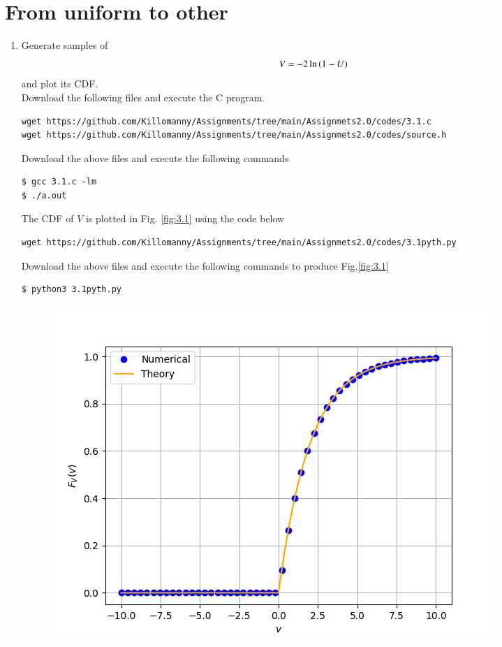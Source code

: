 \documentclass[journal,12pt,twocolumn]{IEEEtran}
\renewcommand\thesection{\arabic{section}}
\begin{document}
\section{From uniform to other}
\begin{enumerate}[label=\thesection.\arabic*
,ref=\thesection.\theenumi]
\item
Generate samples of 
%
\begin{equation}
V = -2\ln\left(1-U\right)
\end{equation}
%
and plot its CDF.  \\
\solution Download the following files and execute the  C program.
\begin{lstlisting}
wget https://github.com/Killomanny/Assignments/tree/main/Assignmets2.0/codes/3.1.c
wget https://github.com/Killomanny/Assignments/tree/main/Assignmets2.0/codes/source.h
\end{lstlisting}
Download the above files and execute the following commands
\begin{lstlisting}
$ gcc 3.1.c -lm
$ ./a.out
\end{lstlisting}
The CDF of $V$ is plotted in Fig. \ref{fig:3.1} using the code below
\begin{lstlisting}
wget https://github.com/Killomanny/Assignments/tree/main/Assignmets2.0/codes/3.1pyth.py
\end{lstlisting}
Download the above files and execute the following commands to produce Fig.\ref{fig:3.1}
\begin{lstlisting}
$ python3 3.1pyth.py
\end{lstlisting}
\begin{figure}[!h]
\centering
\includegraphics[width=\columnwidth]{./figs/3.1.png}

\end{figure}
\end{enumerate}
\end{document}
